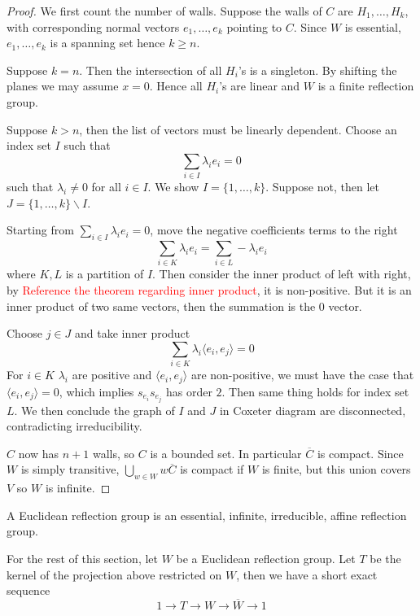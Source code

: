 \documentclass[../main.tex]{subfiles}
\begin{document}
\begin{proof}
    We first count the number of walls. Suppose the walls of $C$ are $H_1,\dots,H_k$, with corresponding normal vectors $e_1,\dots,e_k$ pointing to $C$. Since $W$ is essential, $e_1,\dots,e_k$ is a spanning set hence $k\geq n$.

    Suppose $k=n$. Then the intersection of all $H_i$'s is a singleton. By shifting the planes we may assume $x=0$. Hence all $H_i$'s are linear and $W$ is a finite reflection group.

    Suppose $k>n$, then the list of vectors must be linearly dependent. Choose an index set $I$ such that \[
    \sum_{i\in I} \lambda_i e_i=0
    \]
    such that $\lambda_i \neq 0$ for all $i\in I$. We show $I=\{1,\dots,k\}$. Suppose not, then let $J=\{1,\dots,k\}\backslash I$. 

    Starting from $\sum_{i\in I} \lambda_i e_i=0$, move the negative coefficients terms to the right \[
    \sum_{i\in K} \lambda_i e_i=\sum_{i\in L} -\lambda_i e_i
    \] where $K,L$ is a partition of $I$.
    Then consider the inner product of left with right, by \textcolor{red}{Reference the theorem regarding inner product}, it is non-positive. But it is an inner product of two same vectors, then the summation is the $0$ vector.

    Choose $j\in J$ and take inner product \[
    \sum_{i\in K} \lambda_i \langle e_i,e_j\rangle =0
    \]
    For $i\in K$ $\lambda_i$ are positive and $\langle e_i,e_j\rangle$ are non-positive, we must have the case that $\langle e_i,e_j\rangle=0$, which implies $s_{e_i}s_{e_j}$ has order $2$. Then same thing holds for index set $L$. We then conclude the graph of $I$ and $J$ in Coxeter diagram are disconnected, contradicting irreducibility.

    $C$ now has $n+1$ walls, so $C$ is a bounded set. In particular $\overline C$ is compact. Since $W$ is simply transitive, $\bigcup_{w\in W} w\overline C$ is compact if $W$ is finite, but this union covers $V$ so $W$ is infinite.
\end{proof}

\begin{definition}
    A Euclidean reflection group is an essential, infinite, irreducible, affine reflection group.
\end{definition}

For the rest of this section, let $W$ be a Euclidean reflection group. Let $T$ be the kernel of the projection above restricted on $W$, then we have a short exact sequence \[
1\rightarrow T\rightarrow W \rightarrow\overline W \rightarrow 1
\]
\end{document}
